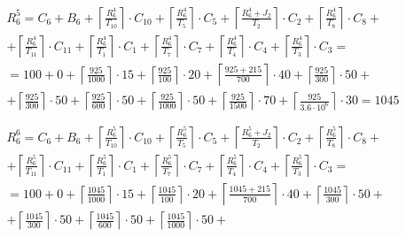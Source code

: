 \begin{gather*}
  \begin{multlined}
    R_6^5 = C_6 + B_6 + \left\lceil\frac{R_6^4}{T_{10}}\right\rceil\cdot C_{10} + %
    \left\lceil\frac{R_6^4}{T_5}\right\rceil\cdot C_5 + %
    \left\lceil\frac{R_6^4 + J_2}{T_2}\right\rceil\cdot C_2 + %
    \left\lceil\frac{R_6^4}{T_8}\right\rceil\cdot C_8 + \\%
    + \left\lceil\frac{R_6^4}{T_{11}}\right\rceil\cdot C_{11} + %
    \left\lceil\frac{R_6^4}{T_1}\right\rceil\cdot C_1 +%
    \left\lceil\frac{R_6^4}{T_7}\right\rceil\cdot C_7 +%
    \left\lceil\frac{R_6^4}{T_4}\right\rceil\cdot C_4 +%
    \left\lceil\frac{R_6^4}{T_3}\right\rceil\cdot C_3 = \\%
    = 100 + 0 + \left\lceil\frac{925}{1000}\right\rceil\cdot 15 + %
    \left\lceil\frac{925}{100}\right\rceil\cdot 20 + %
    \left\lceil\frac{925 + 215}{700}\right\rceil\cdot 40 + %
    \left\lceil\frac{925}{300}\right\rceil\cdot 50 + \\%
    + \left\lceil\frac{925}{300}\right\rceil\cdot 50 + %
    \left\lceil\frac{925}{600}\right\rceil\cdot 50 + %
    \left\lceil\frac{925}{1000}\right\rceil\cdot 50 +%
    \left\lceil\frac{925}{1500}\right\rceil\cdot 70 +%
    \left\lceil\frac{925}{3.6 \cdot 10^6}\right\rceil\cdot 30 = 1045 \\
  \end{multlined} \\
  \begin{multlined}
    R_6^6 = C_6 + B_6 + \left\lceil\frac{R_6^5}{T_{10}}\right\rceil\cdot C_{10} + %
    \left\lceil\frac{R_6^5}{T_5}\right\rceil\cdot C_5 + %
    \left\lceil\frac{R_6^5 + J_2}{T_2}\right\rceil\cdot C_2 + %
    \left\lceil\frac{R_6^5}{T_8}\right\rceil\cdot C_8 + \\%
    + \left\lceil\frac{R_6^5}{T_{11}}\right\rceil\cdot C_{11} + %
    \left\lceil\frac{R_6^5}{T_1}\right\rceil\cdot C_1 +%
    \left\lceil\frac{R_6^5}{T_7}\right\rceil\cdot C_7 +%
    \left\lceil\frac{R_6^5}{T_4}\right\rceil\cdot C_4 +%
    \left\lceil\frac{R_6^5}{T_3}\right\rceil\cdot C_3 = \\%
    = 100 + 0 + \left\lceil\frac{1045}{1000}\right\rceil\cdot 15 + %
    \left\lceil\frac{1045}{100}\right\rceil\cdot 20 + %
    \left\lceil\frac{1045 + 215}{700}\right\rceil\cdot 40 + %
    \left\lceil\frac{1045}{300}\right\rceil\cdot 50 + \\%
    + \left\lceil\frac{1045}{300}\right\rceil\cdot 50 + %
    \left\lceil\frac{1045}{600}\right\rceil\cdot 50 + %
    \left\lceil\frac{1045}{1000}\right\rceil\cdot 50 +%

\end{multlined}
\end{gather*}
